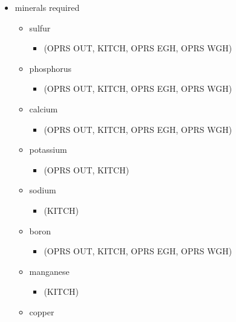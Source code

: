 \begin{itemize}
\itemsep1pt\parskip0pt
\item
  minerals required

  \begin{itemize}
  \itemsep1pt\parskip0pt
  \item
    sulfur

    \begin{itemize}
    \itemsep1pt\parskip0pt
    \item
      (OPRS OUT, KITCH, OPRS EGH, OPRS WGH)
    \end{itemize}
  \item
    phosphorus

    \begin{itemize}
    \itemsep1pt\parskip0pt
    \item
      (OPRS OUT, KITCH, OPRS EGH, OPRS WGH)
    \end{itemize}
  \item
    calcium

    \begin{itemize}
    \itemsep1pt\parskip0pt
    \item
      (OPRS OUT, KITCH, OPRS EGH, OPRS WGH)
    \end{itemize}
  \item
    potassium

    \begin{itemize}
    \itemsep1pt\parskip0pt
    \item
      (OPRS OUT, KITCH)
    \end{itemize}
  \item
    sodium

    \begin{itemize}
    \itemsep1pt\parskip0pt
    \item
      (KITCH)
    \end{itemize}
  \item
    boron

    \begin{itemize}
    \itemsep1pt\parskip0pt
    \item
      (OPRS OUT, KITCH, OPRS EGH, OPRS WGH)
    \end{itemize}
  \item
    manganese

    \begin{itemize}
    \itemsep1pt\parskip0pt
    \item
      (KITCH)
    \end{itemize}
  \item
    copper


\end{itemize}
\end{itemize}
